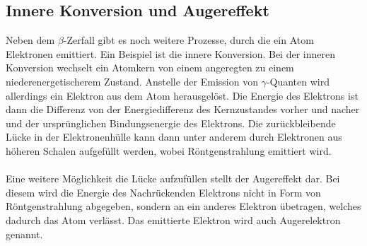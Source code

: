 \subsection{Innere Konversion und Augereffekt}
Neben dem $\beta$-Zerfall gibt es noch weitere Prozesse, durch die ein Atom Elektronen emittiert. Ein Beispiel ist die innere Konversion. Bei der inneren Konversion wechselt ein Atomkern von einem angeregten zu einem niederenergetischerem Zustand. Anstelle der Emission von $\gamma$-Quanten wird allerdings ein Elektron aus dem Atom herausgelöst. Die Energie des Elektrons ist dann die Differenz von der Energiedifferenz des Kernzustandes vorher und nacher und der ursprünglichen Bindungsenergie des Elektrons. Die zurückbleibende Lücke in der Elektronenhülle kann dann unter anderem durch Elektronen aus höheren Schalen aufgefüllt werden, wobei Röntgenstrahlung emittiert wird.\\ \\
Eine weitere Möglichkeit die Lücke aufzufüllen stellt der Augereffekt dar. Bei diesem wird die Energie des Nachrückenden Elektrons nicht in Form von Röntgenstrahlung abgegeben, sondern an ein anderes Elektron übetragen, welches dadurch das Atom verlässt. Das emittierte Elektron wird auch Augerelektron genannt.
